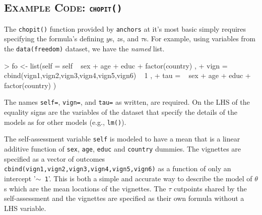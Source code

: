 \documentclass{amsart}
\newcommand{\code}[1]{{\texttt{#1}}}
\newcommand{\pkg}[1]{{\texttt{#1}}}
\newcommand{\ssubsection}[2]{%
  \subsection[#1]{\normalfont\scshape #1: {\tt #2}}}
\begin{document}
\ssubsection{Example Code}{chopit()}

The \code{chopit()} function provided by \pkg{anchors} at it's most
basic simply requires specifying the formula's defining $y$s, $z$s,
and $\tau$s.  For example, using variables from the
\code{data(freedom)} dataset, we have the {\em named} list.
\begin{Schunk}
\begin{Sinput}
> fo <- list(self =  self ~ sex + age + educ + factor(country) ,
+              vign = cbind(vign1,vign2,vign3,vign4,vign5,vign6) ~ 1 ,
+              tau  =       ~ sex + age + educ + factor(country) )
\end{Sinput}
\end{Schunk}
The names \code{self=}, \code{vign=}, and \code{tau=} as written, are
required.  On the LHS of the equality signs are the variables of the
dataset that specify the details of the models as for other models
(e.g., \code{lm()}).

The self-assessment variable \code{self} is modeled to have a mean
that is a linear additive function of \code{sex}, \code{age},
\code{educ} and \code{country} dummies.  The vignettes are specified
as a vector of outcomes
\code{cbind(vign1,vign2,vign3,vign4,vign5,vign6)} as a function of
only an intercept '\code{$\sim$ 1}'.  This is both a simple and
accurate way to describe the model of $\theta$s which are the mean
locations of the vignettes.  The $\tau$ cutpoints shared by the
self-assessment and the vignettes are specified as their own formula
without a LHS variable.
\end{document}
